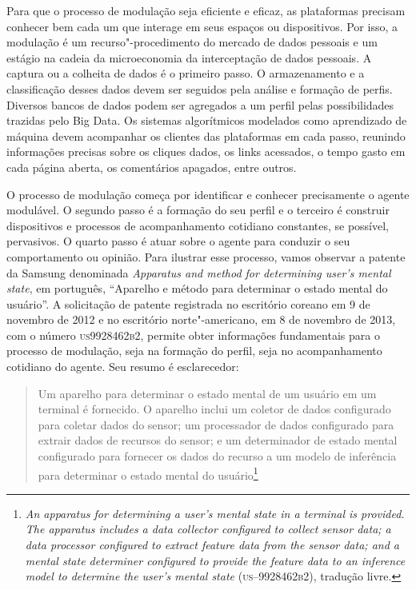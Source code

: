 Para que o processo de modulação seja eficiente e eficaz, as plataformas
precisam conhecer bem cada um que interage em seus espaços ou
dispositivos. Por isso, a modulação é um recurso"-procedimento do mercado
de dados pessoais e um estágio na cadeia da microeconomia da
interceptação de dados pessoais. A captura ou a colheita de dados é o
primeiro passo. O armazenamento e a classificação desses dados devem ser
seguidos pela análise e formação de perfis. Diversos bancos de dados
podem ser agregados a um perfil pelas possibilidades trazidas pelo Big
Data. Os sistemas algorítmicos modelados como aprendizado de máquina
devem acompanhar os clientes das plataformas em cada passo, reunindo
informações precisas sobre os cliques dados, os links acessados, o tempo
gasto em cada página aberta, os comentários apagados, entre outros.

O processo de modulação começa por identificar e conhecer precisamente o
agente modulável. O segundo passo é a formação do seu perfil e o
terceiro é construir dispositivos e processos de acompanhamento
cotidiano constantes, se possível, pervasivos. O quarto passo é atuar
sobre o agente para conduzir o seu comportamento ou opinião. Para
ilustrar esse processo, vamos observar a patente da Samsung denominada
\emph{Apparatus and method for determining user's mental state}, em
português, ``Aparelho e método para determinar o estado mental do
usuário''. A solicitação de patente registrada no escritório coreano em
9 de novembro de 2012 e no escritório norte"-americano, em 8 de novembro
de 2013, com o número \textsc{us9928462b2}, permite obter informações
fundamentais para o processo de modulação, seja na formação do perfil,
seja no acompanhamento cotidiano do agente. Seu resumo é esclarecedor:

\begin{quote}
Um aparelho para determinar o estado mental de um usuário em um terminal
é fornecido. O aparelho inclui um coletor de dados configurado para
coletar dados do sensor; um processador de dados configurado para
extrair dados de recursos do sensor; e um determinador de estado mental
configurado para fornecer os dados do recurso a um modelo de inferência
para determinar o estado mental do usuário\footnote{\emph{An apparatus for
  determining a user's mental state in a terminal is provided. The
  apparatus includes a data collector configured to collect sensor data;
  a data processor configured to extract feature data from the sensor
  data; and a mental state determiner configured to provide the feature
  data to an inference model to determine the user's mental state}
  (\textsc{us--9928462b2}), tradução livre.} 
\end{quote}

